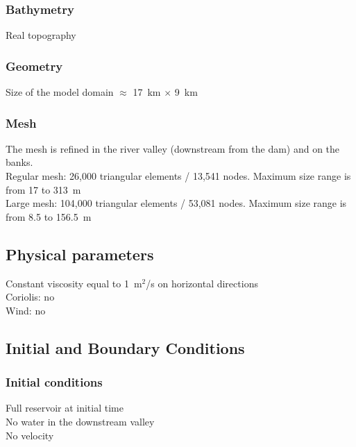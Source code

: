 \subsubsection{Bathymetry}
%
Real topography %
%
\subsubsection{Geometry}
%
Size of the model domain $\approx$ 17~km $\times$ 9~km
%
\subsubsection{Mesh}
%
The mesh is refined in the river valley (downstream from the dam)
and on the banks.\\
Regular mesh: 26,000 triangular elements / 13,541 nodes.
Maximum size range is from 17 to 313~m\\
Large mesh: 104,000 triangular elements / 53,081 nodes.
Maximum size range is from 8.5 to 156.5~m
%
%
%
\subsection{Physical parameters}
%
Constant viscosity equal to 1~m$^2$/s on horizontal directions\\
Coriolis: no\\
Wind: no
%
%
%
%
%
%
\subsection{Initial and Boundary Conditions}
%
\subsubsection{Initial conditions}
%
Full reservoir at initial time\\
No water in the downstream valley\\
No velocity
%
